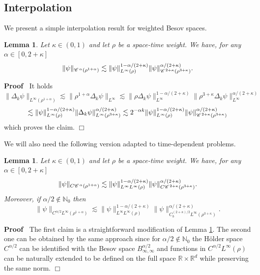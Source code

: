 \documentclass[a4paper,11pt]{article}
\newenvironment{proof}{\noindent\textbf{Proof\ }}{\hspace*{\fill}$\Box$\medskip}
\newtheorem{lemma}[theorem]{Lemma}
\numberwithin{equation}{section}
\newcommand{\CC}{\mathscr{C} \hspace{.1em}}
\newcommand{\R}{\mathbb{R}}
\newcommand{\N}{\mathbb{N}}
\newcommand{\8}{\infty}
\begin{document}
\subsection{Interpolation}

We present a simple interpolation result for  weighted Besov spaces.


\begin{lemma}
  \label{lemma:interp}
 Let $\kappa\in (0,1)$ and let $\rho$ be a space-time weight.  We have, for any $\alpha \in [0, 2 + \kappa]$
  \[ \| \psi \|_{\CC^{\alpha} (\rho^{1 + \alpha})} \lesssim \| \psi
     \|_{L^{\infty} (\rho)}^{1 - \alpha / (2 + \kappa)} \| \psi \|_{\CC^{2 +
     \kappa} (\rho^{3 + \kappa})}^{\alpha / (2 + \kappa)} .\]
\end{lemma}

\begin{proof}
 It holds
  \[ \|  \Delta_k \psi \|_{L^{\infty} (\rho^{1 +
     \alpha})} \lesssim \|  \rho^{1 + \alpha} \Delta_k \psi
     \|_{L^{\infty}} \lesssim \|  \rho \Delta_k \psi
     \|_{L^{\infty}}^{1 - \alpha / (2 + \kappa)} \|  \rho^{3 +
     \kappa} \Delta_k \psi \|_{L^{\infty}}^{\alpha / (2 + \kappa)} \]
  \[ \lesssim \| \psi \|_{L^{\infty} (\rho)}^{1 - \alpha /
     (2 + \kappa)} \| \Delta_k \psi \|_{L^{\infty}
     (\rho^{3 + \kappa})}^{\alpha / (2 + \kappa)} \lesssim 2^{- \alpha k} \|
\psi \|_{ L^{\infty} (\rho)}^{1 - \alpha / (2 + \kappa)} \|
 \psi \|_{\CC^{2 + \kappa} (\rho^{3 +
     \kappa})}^{\alpha / (2 + \kappa)} \]
  which proves the  claim.
\end{proof}


We will also need the following version  adapted to time-dependent problems.



\begin{lemma}
  \label{lemma:interp2}
Let $\kappa\in (0,1)$ and let $\rho$ be a space-time weight.  We have, for any $\alpha \in [0, 2 + \kappa]$
  \[ \| \psi \|_{C\CC^{\alpha} (\rho^{1 + \alpha})} \lesssim \| \psi
     \|_{L^{\8}L^{\infty} (\rho)}^{1 - \alpha / (2 + \kappa)} \| \psi \|_{C\CC^{2 +
     \kappa} (\rho^{3 + \kappa})}^{\alpha / (2 + \kappa)} .\]
Moreover, if  $\alpha/2\notin\N_{0}$ then
       \[ \| \psi \|_{C^{\alpha/2}L^{\8} (\rho^{1 + \alpha})} \lesssim \| \psi
     \|_{L^{\8}L^{\infty} (\rho)}^{1 - \alpha / (2 + \kappa)} \| \psi \|_{C^{(2+\kappa)/2}_{b}L^{\8} (\rho^{3 + \kappa})}^{\alpha / (2 + \kappa)} .\]
\end{lemma}

\begin{proof}
The first claim is a straightforward modification of Lemma \ref{lemma:interp}.
The second one can be obtained by the same approach since for $\alpha/2\notin\N_{0}$ the H\"older space $C^{\alpha/2}$ can be identified with the Besov space $B^{\alpha/2}_{\8,\8}$ and functions in $C^{\alpha/2}L^{\8}(\rho)$ can be naturally extended to be defined on the full space $\R\times\R^{d}$ while preserving the same norm.
\end{proof}
\end{document}
